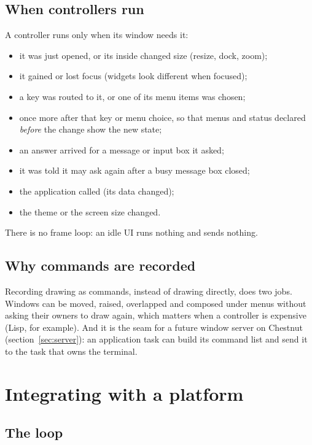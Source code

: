 \documentclass[11pt,a4paper]{article}
\newcommand{\fn}[1]{\texttt{\detokenize{#1}}}
\begin{document}
\subsection{When controllers run}

A controller runs only when its window needs it:

\begin{itemize}
\item it was just opened, or its inside changed size (resize, dock, zoom);
\item it gained or lost focus (widgets look different when focused);
\item a key was routed to it, or one of its menu items was chosen;
\item once more after that key or menu choice, so that menus and status
  declared \emph{before} the change show the new state;
\item an answer arrived for a message or input box it asked;
\item it was told it may ask again after a busy message box closed;
\item the application called \fn{tui_window_invalidate} (its data changed);
\item the theme or the screen size changed.
\end{itemize}

There is no frame loop: an idle UI runs nothing and sends nothing.

\subsection{Why commands are recorded}

Recording drawing as commands, instead of drawing directly, does two jobs.
Windows can be moved, raised, overlapped and composed under menus without
asking their owners to draw again, which matters when a controller is
expensive (Lisp, for example). And it is the seam for a future window server
on Chestnut (section~\ref{sec:server}): an application task can build its
command list and send it to the task that owns the terminal.

\section{Integrating with a platform}

\subsection{The loop}
\end{document}
